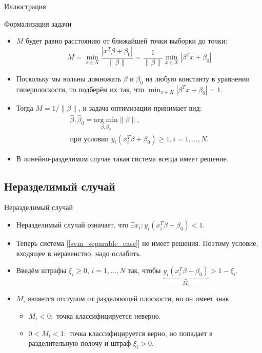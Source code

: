 \documentclass[9pt]{beamer}
\begin{document}
\begin{frame}{Иллюстрация}
\end{frame}

\begin{frame}{Формализация задачи}
    \begin{itemize}
        \item $M$ будет равно расстоянию от ближайшей точки выборки до точки:
        $$M = \min_{x\in X}\frac{|x^T\beta + \beta_0|}{\|\beta\|} = \frac{1}{\|\beta\|}\min_{x\in X}|\beta^Tx + \beta_0|$$
        \item Поскольку мы вольны домножать $\beta$ и $\beta_0$ на любую константу в уравнении гиперплоскости, то подберём их так, что $\min_{x\in X}|\beta^Tx + \beta_0| = 1$.
        \item Тогда $M = 1/\|\beta\|$, и задача оптимизации принимает вид:
        \begin{equation}\label{svm_separable_case}
        \begin{gathered}
            \hat\beta, \hat\beta_0 = \underset{\beta,\beta_0}{\mathrm{arg\;min}} \|\beta\|,\\ \text{при условии } y_i(x_i^T\beta+\beta_0) \geq 1, i=1,\ldots,N.
        \end{gathered}
        \end{equation}
        \item В линейно-разделимом случае такая система всегда имеет решение.
    \end{itemize}
\end{frame}

\subsection{Неразделимый случай}

\begin{frame}{Неразделимый случай}
    \begin{itemize}
        \item Неразделимый случай означает, что $\exists x_i: y_i(x_i^T\beta+\beta_0) < 1$.
        \item Теперь система [\ref{svm_separable_case}] не имеет решения. Поэтому условие, входящее в неравенство, надо ослабить.
        \item Введём штрафы $\xi_i \geq 0$, $i=1,\ldots,N$ так, чтобы $\underbrace{y_i(x_i^T\beta+\beta_0)}_{M_i} > 1 - \xi_i$.
        \item $M_i$ является отступом от разделяющей плоскости, но он имеет знак.
        \begin{itemize}
            \item $M_i < 0:$ точка классифицируется неверно.
            \item $0 < M_i < 1:$ точка классифицируется верно, но попадает в разделительную полочу и штраф $\xi_i > 0$.
        \end{itemize}
    \end{itemize}
\end{frame}
\end{document}
